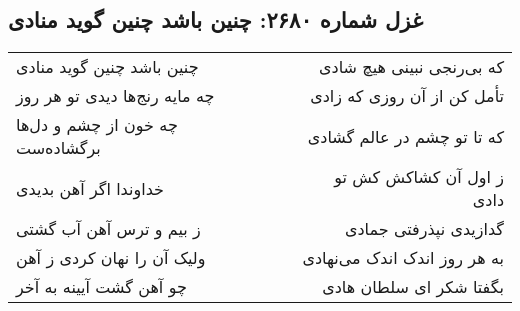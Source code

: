 \begin{center}
\section*{غزل شماره ۲۶۸۰: چنین باشد چنین گوید منادی}
\label{sec:2680}
\begin{longtable}{l p{0.5cm} r}
چنین باشد چنین گوید منادی
&&
که بی‌رنجی نبینی هیچ شادی
\\
چه مایه رنج‌ها دیدی تو هر روز
&&
تأمل کن از آن روزی که زادی
\\
چه خون از چشم و دل‌ها برگشاده‌ست
&&
که تا تو چشم در عالم گشادی
\\
خداوندا اگر آهن بدیدی
&&
ز اول آن کشاکش کش تو دادی
\\
ز بیم و ترس آهن آب گشتی
&&
گدازیدی نپذرفتی جمادی
\\
ولیک آن را نهان کردی ز آهن
&&
به هر روز اندک اندک می‌نهادی
\\
چو آهن گشت آیینه به آخر
&&
بگفتا شکر ای سلطان هادی
\\
\end{longtable}
\end{center}

